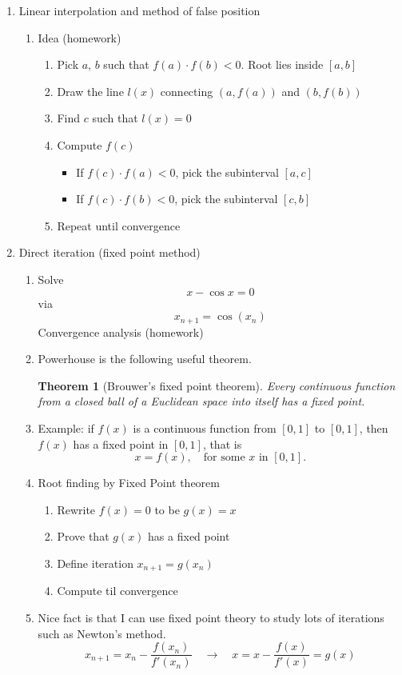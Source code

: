 \documentclass{article}
\newtheorem{thm}{Theorem}[section]
\theoremstyle{remark}
\begin{document}
\begin{enumerate}
\item Linear interpolation and method of false position
\begin{enumerate}
\item Idea (homework)
\begin{enumerate}
\item Pick $a$, $b$ such that $f(a)\cdot f(b) <0$. Root lies inside $[a,b]$
\item Draw the line $l(x)$ connecting $(a,f(a))$ and $(b,f(b))$
\item Find $c$ such that $l(x) = 0$
\item Compute $f(c)$
\begin{itemize}
\item If $f(c)\cdot f(a) < 0$, pick the subinterval $[a,c]$
\item If $f(c)\cdot f(b) < 0$, pick the subinterval $[c,b]$
\end{itemize}
\item Repeat until convergence
\end{enumerate}
\end{enumerate}

\item Direct iteration (fixed point method)
\begin{enumerate}
\item Solve 
$$
x - \cos x = 0
$$
via
$$
x_{n+1} = \cos (x_n)
$$
Convergence analysis (homework)
\item Powerhouse is the following useful theorem.
\begin{thm}[Brouwer's fixed point theorem]
Every continuous function from a closed ball of a Euclidean space into itself has a fixed point.
\end{thm}
\item 
Example: if $f(x)$ is a continuous function from $[0,1]$ to $[0,1]$, then $f(x)$ has a fixed point in $[0,1]$, that is 
$$
x = f(x),\quad\text{for some $x$ in $[0,1]$}.
$$
\item Root finding by Fixed Point theorem
\begin{enumerate}
\item Rewrite $f(x) = 0$ to be $
g(x) = x$
\item Prove that $g(x)$ has a fixed point
\item Define iteration $x_{n+1} = g(x_n)$
\item Compute til convergence
\end{enumerate}
\item Nice fact is that I can use fixed point theory to study lots of iterations such as Newton's method.
\[
x_{n+1} = x_n - \frac{f(x_n)}{f'(x_n)} \quad \rightarrow \quad x = x - \frac{f(x)}{f'(x)} = g(x)
\]
\end{enumerate}
\end{enumerate}
\end{document}
